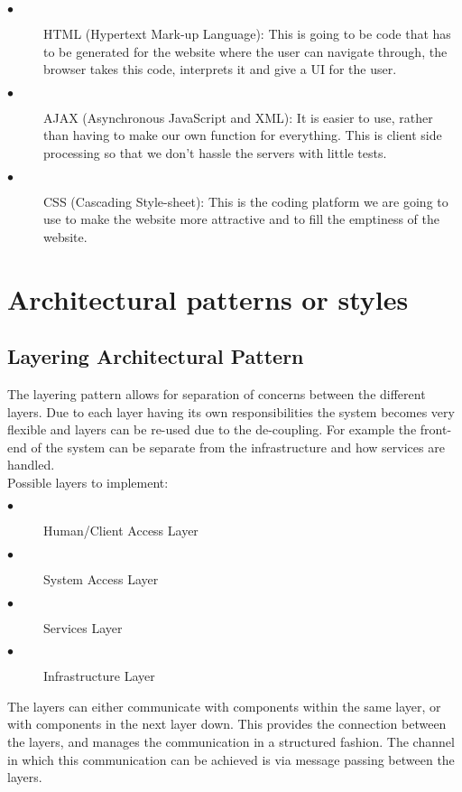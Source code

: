 \documentclass[12pt]{article}
\begin{document}
\begin{description}
  \item[$\bullet$] HTML (Hypertext Mark-up Language):
  This is going to be code that has to be generated for the website where the user can navigate through, the browser takes this code, interprets it and give a UI for the user. 
  
  \item[$\bullet$] AJAX (Asynchronous JavaScript and XML):
  It is easier to use, rather than having to make our own function for everything. This is client side processing so that we don’t hassle the servers with little tests.
  
  \item[$\bullet$] CSS (Cascading Style-sheet):
  This is the coding platform we are going to use to make the website more attractive and to fill the emptiness of the website.
\end{description}

\section{Architectural patterns or styles}
\subsection{Layering Architectural Pattern}
The layering pattern allows for separation of concerns between the different layers. Due to each layer having its own responsibilities the system becomes very flexible and layers can be re-used due to the de-coupling. For example the front-end of the system can be separate from the infrastructure and how services are handled.\\
Possible layers to implement: 
\begin{description}
\item[$\bullet$]Human/Client Access Layer
\item[$\bullet$]System Access Layer
\item[$\bullet$]Services Layer
\item[$\bullet$]Infrastructure Layer
\end{description}
The layers can either communicate with components within the same layer, or with components in the next layer down. This provides the connection between the layers, and manages the communication
in a structured fashion. The channel in which this communication can be achieved is via message passing between the layers.
\end{document}
